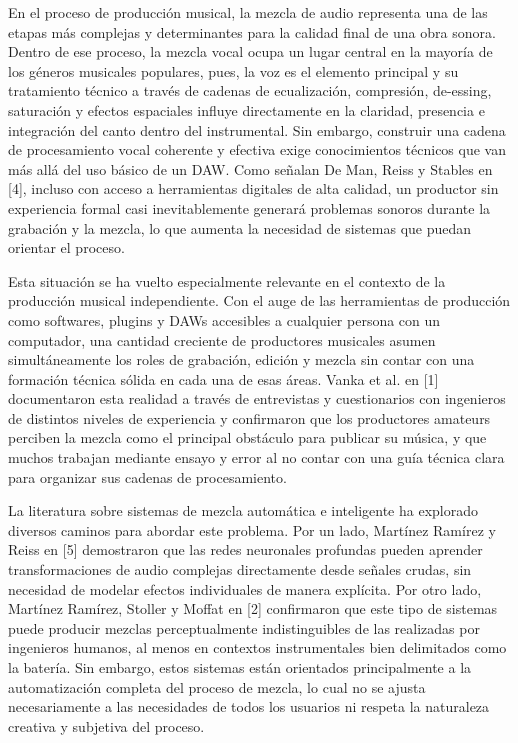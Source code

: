 \documentclass[12pt]{article}
\begin{document}
En el proceso de producción musical, la mezcla de audio representa una de las etapas más complejas y determinantes para la calidad final de una obra sonora. Dentro de ese proceso, la mezcla vocal ocupa un lugar central en la mayoría de los géneros musicales populares, pues, la voz es el elemento principal y su tratamiento técnico a través de cadenas de ecualización, compresión, de-essing, saturación y efectos espaciales influye directamente en la claridad, presencia e integración del canto dentro del instrumental. Sin embargo, construir una cadena de procesamiento vocal coherente y efectiva exige conocimientos técnicos que van más allá del uso básico de un DAW. Como señalan De Man, Reiss y Stables en [4], incluso con acceso a herramientas digitales de alta calidad, un productor sin experiencia formal casi inevitablemente generará problemas sonoros durante la grabación y la mezcla, lo que aumenta la necesidad de sistemas que puedan orientar el proceso.

Esta situación se ha vuelto especialmente relevante en el contexto de la producción musical independiente. Con el auge de las herramientas de producción como softwares, plugins y DAWs accesibles a cualquier persona con un computador, una cantidad creciente de productores musicales asumen simultáneamente los roles de grabación, edición y mezcla sin contar con una formación técnica sólida en cada una de esas áreas. Vanka et al. en [1] documentaron esta realidad a través de entrevistas y cuestionarios con ingenieros de distintos niveles de experiencia y confirmaron que los productores amateurs perciben la mezcla como el principal obstáculo para publicar su música, y que muchos trabajan mediante ensayo y error al no contar con una guía técnica clara para organizar sus cadenas de procesamiento.

La literatura sobre sistemas de mezcla automática e inteligente ha explorado diversos caminos para abordar este problema. Por un lado, Martínez Ramírez y Reiss en [5] demostraron que las redes neuronales profundas pueden aprender transformaciones de audio complejas directamente desde señales crudas, sin necesidad de modelar efectos individuales de manera explícita. Por otro lado, Martínez Ramírez, Stoller y Moffat en [2] confirmaron que este tipo de sistemas puede producir mezclas perceptualmente indistinguibles de las realizadas por ingenieros humanos, al menos en contextos instrumentales bien delimitados como la batería. Sin embargo, estos sistemas están orientados principalmente a la automatización completa del proceso de mezcla, lo cual no se ajusta necesariamente a las necesidades de todos los usuarios ni respeta la naturaleza creativa y subjetiva del proceso.
\end{document}
